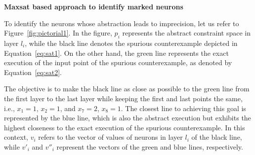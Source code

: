 \noindent\textbf{Maxsat based approach to identify marked neurons}\\
{\color{red} To identify the neurons whose abstraction leads to imprecision, let us refer to Figure~\ref{fig:pictorial1}. 
In the figure, $p_i$ represents the abstract constraint space in layer $l_i$, while the black line denotes 
the spurious counterexample depicted in Equation~\ref{eq:sat1}. 
On the other hand, the green line represents the exact execution of the input point of the spurious counterexample, 
as denoted by Equation~\ref{eq:sat2}.

The objective is to make the black line as close as possible to the green line from the first layer to the last layer 
while keeping the first and last points the same, i.e., $x_1 = 1$, $x_2 = 1$, and $x_7 = 2$, $x_8 = 1$. 
The closest line to achieving this goal is represented by the blue line, 
which is also the abstract execution but exhibits the highest closeness to the exact execution of the spurious counterexample.
In this context, $v_i$ refers to the vector of values of neurons in layer $l_i$ of the black line, 
while $v'_i$ and $v''_i$ represent the vectors of the green and blue lines, respectively.
}

